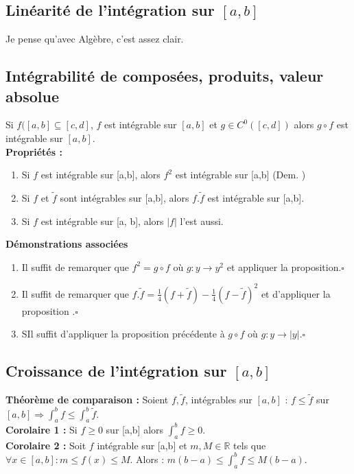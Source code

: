\documentclass	[11pt, a4paper, openany]{book}
\begin{document}
\subsection{Linéarité de l'intégration sur $[a,b]$} 
Je pense qu'avec Algèbre, c'est assez clair.

\subsection{Intégrabilité de composées, produits, valeur absolue}
Si $f([a,b] \subseteq [c,d]$, $f$ est intégrable sur $[a,b]$ et $g \in C^0([c,d])$ alors $g \circ f$ est intégrable sur $[a,b]$.\\

\textbf{Propriétés :}
\begin{enumerate}
\item Si $f$ est intégrable sur [a,b], alors $f^2$ est intégrable sur [a,b] (Dem. )
\item Si $f$ et $\tilde{f}$ sont intégrables sur [a,b], alors $f . \tilde{f}$ est intégrable sur [a,b].
\item Si $f$ est intégrable sur [a, b], alors $|f|$ l'est aussi.
\end{enumerate}
\textbf{Démonstrations associées}
\begin{enumerate}
\item Il suffit de remarquer que $f^2 = g \circ f$ où $g : y \rightarrow y^2$ et appliquer la proposition.$\square$
\item Il suffit de remarquer que $f . \tilde{f} = \frac{1}{4}(f + \tilde{f}) - \frac{1}{4}(f - \tilde{f})^2$ et d'appliquer la proposition .$\square$
\item SIl suffit d'appliquer la proposition précédente à $g \circ f$ où $g : y \rightarrow |y|$.$\square$
\end{enumerate}

\subsection{Croissance de l'intégration sur $[a,b]$}
\textbf{Théorème de comparaison :} Soient $f, \tilde{f}$, intégrables sur $[a,b]$ : $f \leq \tilde{f}$ sur $[a, b] \Rightarrow \int_a^b f \leq \int_a^b \tilde{f}$.\\

\textbf{Corolaire 1 :} Si $f \geq 0$ sur [a,b] alors $\int_a^b f \geq 0$.\\

\textbf{Corolaire 2 :} Soit $f$ intégrable sur [a,b] et $m, M \in \mathbb{R}$ tels que $\forall x \in [a, b] : m \leq f(x) \leq M$. Alors : $m(b-a) \leq \int_a^b f \leq M(b-a)$.\\
\end{document}
